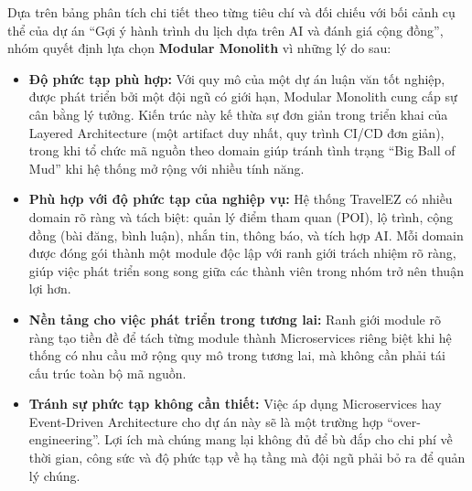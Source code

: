Dựa trên bảng phân tích chi tiết theo từng tiêu chí và đối chiếu với bối cảnh cụ thể của dự án ``Gợi ý hành trình du lịch dựa trên AI và đánh giá cộng đồng'', nhóm quyết định lựa chọn \textbf{Modular Monolith} vì những lý do sau:
\begin{itemize}
    \item \textbf{Độ phức tạp phù hợp:} Với quy mô của một dự án luận văn tốt nghiệp, được phát triển bởi một đội ngũ có giới hạn, Modular Monolith cung cấp sự cân bằng lý tưởng. Kiến trúc này kế thừa sự đơn giản trong triển khai của Layered Architecture (một artifact duy nhất, quy trình CI/CD đơn giản), trong khi tổ chức mã nguồn theo domain giúp tránh tình trạng ``Big Ball of Mud'' khi hệ thống mở rộng với nhiều tính năng.
    \item \textbf{Phù hợp với độ phức tạp của nghiệp vụ:} Hệ thống TravelEZ có nhiều domain rõ ràng và tách biệt: quản lý điểm tham quan (POI), lộ trình, cộng đồng (bài đăng, bình luận), nhắn tin, thông báo, và tích hợp AI. Mỗi domain được đóng gói thành một module độc lập với ranh giới trách nhiệm rõ ràng, giúp việc phát triển song song giữa các thành viên trong nhóm trở nên thuận lợi hơn.
    \item \textbf{Nền tảng cho việc phát triển trong tương lai:} Ranh giới module rõ ràng tạo tiền đề để tách từng module thành Microservices riêng biệt khi hệ thống có nhu cầu mở rộng quy mô trong tương lai, mà không cần phải tái cấu trúc toàn bộ mã nguồn.
    \item \textbf{Tránh sự phức tạp không cần thiết:} Việc áp dụng Microservices hay Event-Driven Architecture cho dự án này sẽ là một trường hợp ``over-engineering''. Lợi ích mà chúng mang lại không đủ để bù đắp cho chi phí về thời gian, công sức và độ phức tạp về hạ tầng mà đội ngũ phải bỏ ra để quản lý chúng.
\end{itemize}
